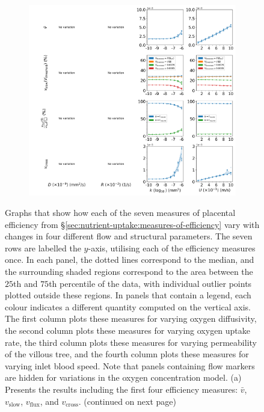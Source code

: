             \begin{figure}
                \hspace{-0.8cm}
                \centering
                \begin{subfigure}{\textwidth}
                    \includegraphics[width=1.0\textwidth]{diagrams/results-variations/mega1_oxygen_diffusivity_oxygen_uptake_permeability_inlet_velocity.png}
                    \caption{}
                    \label{fig:mega-other2:1}
                \end{subfigure}
                \caption{Graphs that show how each of the seven measures of placental efficiency from \S\ref{sec:nutrient-uptake:measures-of-efficiency} vary with changes in four different flow and structural parameters. The seven rows are labelled the $y$-axis, utilising each of the efficiency measures once. In each panel, the dotted lines correspond to the median, and the surrounding shaded regions correspond to the area between the $25$th and $75$th percentile of the data, with individual outlier points plotted outside these regions. In panels that contain a legend, each colour indicates a different quantity computed on the vertical axis. The first column plots these measures for varying oxygen diffusivity, the second column plots these measures for varying oxygen uptake rate, the third column plots these measures for varying permeability of the villous tree, and the fourth column plots these measures for varying inlet blood speed. Note that panels containing flow markers are hidden for variations in the oxygen concentration model. (a) Presents the results including the first four efficiency measures: $\bar{v}$, $v_\text{slow}$, $v_\text{flux}$, and $v_\text{cross}$. (continued on next page)}
            \end{figure}
